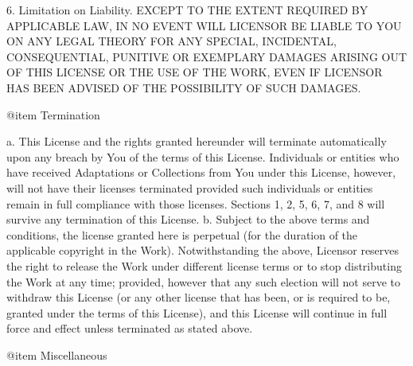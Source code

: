 6. Limitation on Liability. EXCEPT TO THE EXTENT REQUIRED BY APPLICABLE
LAW, IN NO EVENT WILL LICENSOR BE LIABLE TO YOU ON ANY LEGAL THEORY FOR
ANY SPECIAL, INCIDENTAL, CONSEQUENTIAL, PUNITIVE OR EXEMPLARY DAMAGES
ARISING OUT OF THIS LICENSE OR THE USE OF THE WORK, EVEN IF LICENSOR HAS
BEEN ADVISED OF THE POSSIBILITY OF SUCH DAMAGES.

@item
Termination

 a. This License and the rights granted hereunder will terminate
    automatically upon any breach by You of the terms of this License.
    Individuals or entities who have received Adaptations or Collections
    from You under this License, however, will not have their licenses
    terminated provided such individuals or entities remain in full
    compliance with those licenses. Sections 1, 2, 5, 6, 7, and 8 will
    survive any termination of this License.
 b. Subject to the above terms and conditions, the license granted here is
    perpetual (for the duration of the applicable copyright in the Work).
    Notwithstanding the above, Licensor reserves the right to release the
    Work under different license terms or to stop distributing the Work at
    any time; provided, however that any such election will not serve to
    withdraw this License (or any other license that has been, or is
    required to be, granted under the terms of this License), and this
    License will continue in full force and effect unless terminated as
    stated above.

@item
Miscellaneous

